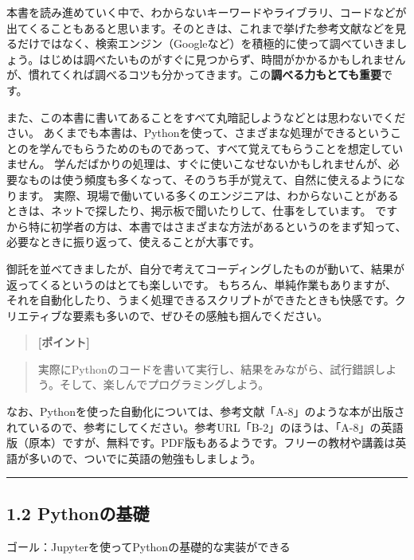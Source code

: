 \documentclass[11pt]{article}
\begin{document}
    本書を読み進めていく中で、わからないキーワードやライブラリ、コードなどが出てくることもあると思います。そのときは、これまで挙げた参考文献などを見るだけではなく、検索エンジン（Googleなど）を積極的に使って調べていきましょう。はじめは調べたいものがすぐに見つからず、時間がかかるかもしれませんが、慣れてくれば調べるコツも分かってきます。この\textbf{調べる力もとても重要}です。

また、この本書に書いてあることをすべて丸暗記しようなどとは思わないでください。
あくまでも本書は、Pythonを使って、さまざまな処理ができるということのを学んでもらうためのものであって、すべて覚えてもらうことを想定していません。
学んだばかりの処理は、すぐに使いこなせないかもしれませんが、必要なものは使う頻度も多くなって、そのうち手が覚えて、自然に使えるようになります。
実際、現場で働いている多くのエンジニアは、わからないことがあるときは、ネットで探したり、掲示板で聞いたりして、仕事をしています。
ですから特に初学者の方は、本書ではさまざまな方法があるというのをまず知って、必要なときに振り返って、使えることが大事です。

    御託を並べてきましたが、自分で考えてコーディングしたものが動いて、結果が返ってくるというのはとても楽しいです。
もちろん、単純作業もありますが、それを自動化したり、うまく処理できるスクリプトができたときも快感です。クリエティブな要素も多いので、ぜひその感触も掴んでください。

    \begin{quote}
\textbf{{[}ポイント{]}}
\end{quote}

\begin{quote}
実際にPythonのコードを書いて実行し、結果をみながら、試行錯誤しよう。そして、楽しんでプログラミングしよう。
\end{quote}

    なお、Pythonを使った自動化については、参考文献「A-8」のような本が出版されているので、参考にしてください。参考URL「B-2」のほうは、「A-8」の英語版（原本）ですが、無料です。PDF版もあるようです。フリーの教材や講義は英語が多いので、ついでに英語の勉強もしましょう。

    \begin{center}\rule{0.5\linewidth}{\linethickness}\end{center}

    \subsection{1.2 Pythonの基礎}\label{pythonux306eux57faux790e}

ゴール：Jupyterを使ってPythonの基礎的な実装ができる
\end{document}
